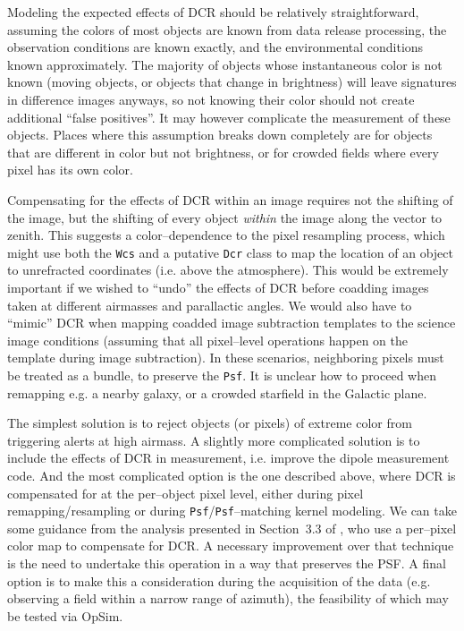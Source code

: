 \documentclass[DM,toc]{lsstdoc}
\begin{document}
Modeling the expected effects of DCR should be relatively
straightforward, assuming the colors of most objects are known from
data release processing, the observation conditions are known exactly,
and the environmental conditions known approximately.  The majority of
objects whose instantaneous color is not known (moving objects, or
objects that change in brightness) will leave signatures in difference
images anyways, so not knowing their color should not create
additional ``false positives''.  It may however complicate the
measurement of these objects.  Places where this assumption breaks
down completely are for objects that are different in color but not
brightness, or for crowded fields where every pixel has its own color.

Compensating for the effects of DCR within an image requires not the
shifting of the image, but the shifting of every object {\it within}
the image along the vector to zenith.  This suggests a
color--dependence to the pixel resampling process, which might use both
the {\tt Wcs} and a putative {\tt Dcr} class to map the location of an
object to unrefracted coordinates (i.e. above the atmosphere).  This
would be extremely important if we wished to ``undo'' the effects of
DCR before coadding images taken at different airmasses and
parallactic angles.  We would also have to ``mimic'' DCR when mapping
coadded image subtraction templates to the science image conditions
(assuming that all pixel--level operations happen on the template
during image subtraction).  In these scenarios, neighboring pixels
must be treated as a bundle, to preserve the {\tt Psf}.  It is unclear
how to proceed when remapping e.g. a nearby galaxy, or a crowded
starfield in the Galactic plane.

The simplest solution is to reject objects (or pixels) of extreme
color from triggering alerts at high airmass.  A slightly more
complicated solution is to include the effects of DCR in measurement,
i.e. improve the dipole measurement code.  And the most complicated
option is the one described above, where DCR is compensated for at the
per--object pixel level, either during pixel remapping/resampling or
during {\tt Psf}/{\tt Psf}--matching kernel modeling.  We can take
some guidance from the analysis presented in Section~3.3 of
\citet{1999ApJ...521..602A}, who use a per--pixel color map to
compensate for DCR.  A necessary improvement over that technique is
the need to undertake this operation in a way that preserves the PSF.
A final option is to make this a consideration during the acquisition
of the data (e.g. observing a field within a narrow range of azimuth),
the feasibility of which may be tested via OpSim.
\end{document}

